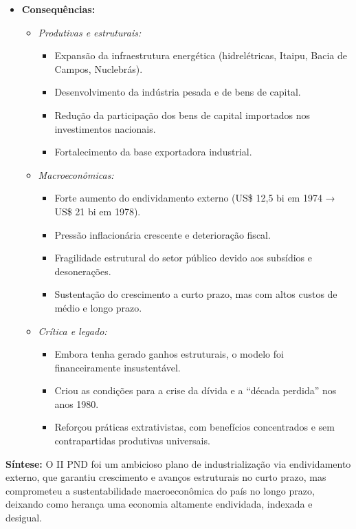 \documentclass[a4paper,12pt]{article}[abntex2]
\begin{document}
\begin{itemize}
    \item \textbf{Consequências:}
    \begin{itemize}
        \item \textit{Produtivas e estruturais:}
        \begin{itemize}
            \item Expansão da infraestrutura energética (hidrelétricas, Itaipu, Bacia de Campos, Nuclebrás).
            \item Desenvolvimento da indústria pesada e de bens de capital.
            \item Redução da participação dos bens de capital importados nos investimentos nacionais.
            \item Fortalecimento da base exportadora industrial.
        \end{itemize}
        
        \item \textit{Macroeconômicas:}
        \begin{itemize}
            \item Forte aumento do endividamento externo (US\$ 12,5 bi em 1974 → US\$ 21 bi em 1978).
            \item Pressão inflacionária crescente e deterioração fiscal.
            \item Fragilidade estrutural do setor público devido aos subsídios e desonerações.
            \item Sustentação do crescimento a curto prazo, mas com altos custos de médio e longo prazo.
        \end{itemize}

        \item \textit{Crítica e legado:}
        \begin{itemize}
            \item Embora tenha gerado ganhos estruturais, o modelo foi financeiramente insustentável.
            \item Criou as condições para a crise da dívida e a “década perdida” nos anos 1980.
            \item Reforçou práticas extrativistas, com benefícios concentrados e sem contrapartidas produtivas universais.
        \end{itemize}
    \end{itemize}
\end{itemize}

\textbf{Síntese:} O II PND foi um ambicioso plano de industrialização via endividamento externo, que garantiu crescimento e avanços estruturais no curto prazo, mas comprometeu a sustentabilidade macroeconômica do país no longo prazo, deixando como herança uma economia altamente endividada, indexada e desigual.
\end{document}
